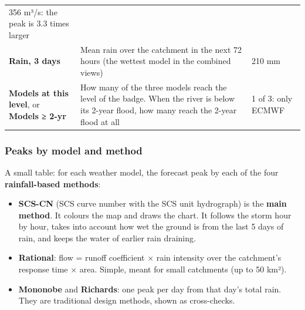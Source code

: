 \documentclass[
  10pt,
]{article}
\providecommand{\tightlist}{%
  \setlength{\itemsep}{0pt}\setlength{\parskip}{0pt}}
\begin{document}
\begin{longtable}[]{@{}lll@{}}
\begin{minipage}[t]{0.30\columnwidth}
356 m³/s: the peak is 3.3 times larger\strut
\end{minipage}\tabularnewline
\begin{minipage}[t]{0.30\columnwidth}\raggedright
\textbf{Rain, 3 days}\strut
\end{minipage} & \begin{minipage}[t]{0.30\columnwidth}\raggedright
Mean rain over the catchment in the next 72 hours (the wettest model in
the combined views)\strut
\end{minipage} & \begin{minipage}[t]{0.30\columnwidth}\raggedright
210 mm\strut
\end{minipage}\tabularnewline
\begin{minipage}[t]{0.30\columnwidth}\raggedright
\textbf{Models at this level}, or \textbf{Models ≥ 2-yr}\strut
\end{minipage} & \begin{minipage}[t]{0.30\columnwidth}\raggedright
How many of the three models reach the level of the badge. When the
river is below its 2-year flood, how many reach the 2-year flood at
all\strut
\end{minipage} & \begin{minipage}[t]{0.30\columnwidth}\raggedright
1 of 3: only ECMWF\strut
\end{minipage}\tabularnewline
\bottomrule
\end{longtable}

\hypertarget{peaks-by-model-and-method}{%
\subsubsection{Peaks by model and
method}\label{peaks-by-model-and-method}}

A small table: for each weather model, the forecast peak by each of the
four \textbf{rainfall-based methods}:

\begin{itemize}
\tightlist
\item
  \textbf{SCS-CN} (SCS curve number with the SCS unit hydrograph) is the
  \textbf{main method}. It colours the map and draws the chart. It
  follows the storm hour by hour, takes into account how wet the ground
  is from the last 5 days of rain, and keeps the water of earlier rain
  draining.
\item
  \textbf{Rational}: flow = runoff coefficient × rain intensity over the
  catchment's response time × area. Simple, meant for small catchments
  (up to 50 km²).
\item
  \textbf{Mononobe} and \textbf{Richards}: one peak per day from that
  day's total rain. They are traditional design methods, shown as
  cross-checks.
\end{itemize}
\end{document}
